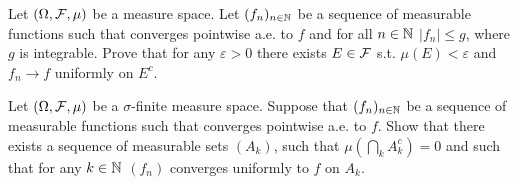 \begin{problem} Let $(\Omega, \mathcal F, \mu)$ be a measure space.
Let $(f_n)_{n\in\mathbb N}$ be a sequence of measurable functions such that converges pointwise a.e. to $f$ and for all $n\in\mathbb N$ $|f_n| \leq g$, where $g$ is integrable.
 Prove that for any $\varepsilon > 0$ there exists $E\in\mathcal F$ s.t. $\mu(E) < \varepsilon$ and $f_n \to f$ uniformly on $E^c$.
\end{problem}

\begin{problem} Let $(\Omega, \mathcal F, \mu)$ be a $\sigma$-finite measure space.
Suppose that $(f_n)_{n\in\mathbb N}$ be a sequence of measurable functions such that converges pointwise a.e. to $f$.
Show that there exists a sequence of measurable sets $(A_k)$, such that $\mu \left( \bigcap_k A_k^c \right) = 0$ and such that for any $k\in\mathbb N$ $(f_n)$ converges uniformly to $f$ on $A_k$.
\end{problem}

